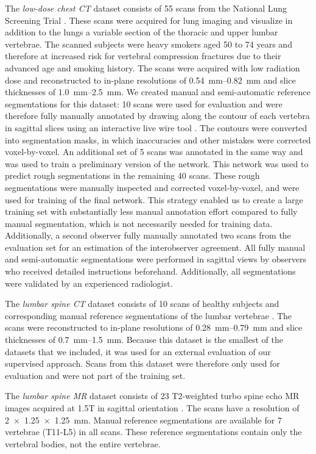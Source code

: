 \documentclass[authoryear,5p,final,times]{elsarticle}
\begin{document}
    The \emph{low-dose chest CT} dataset consists of 55 scans from the National Lung Screening Trial \citep{NLST2011}. These scans were acquired for lung imaging and visualize in addition to the lungs a variable section of the thoracic and upper lumbar vertebrae. The scanned subjects were heavy smokers aged 50 to 74 years and therefore at increased risk for vertebral compression fractures due to their advanced age and smoking history. The scans were acquired with low radiation dose and reconstructed to in-plane resolutions of \SIrange{0.54}{0.82}{\milli\meter} and slice thicknesses of \SIrange{1.0}{2.5}{\milli\meter}. We created manual and semi-automatic reference segmentations for this dataset: 10 scans were used for evaluation and were therefore fully manually annotated by drawing along the contour of each vertebra in sagittal slices using an interactive live wire tool \citep{Barrett1997}. The contours were converted into segmentation masks, in which inaccuracies and other mistakes were corrected voxel-by-voxel. An additional set of 5 scans was annotated in the same way and was used to train a preliminary version of the network. This network was used to predict rough segmentations in the remaining 40 scans. These rough segmentations were manually inspected and corrected voxel-by-voxel, and were used for training of the final network. This strategy enabled us to create a large training set with substantially less manual annotation effort compared to fully manual segmentation, which is not necessarily needed for training data. Additionally, a second observer fully manually annotated two scans from the evaluation set for an estimation of the interobserver agreement. All fully manual and semi-automatic segmentations were performed in sagittal views by observers who received detailed instructions beforehand. Additionally, all segmentations were validated by an experienced radiologist.

    The \emph{lumbar spine CT} dataset consists of 10 scans of healthy subjects and corresponding manual reference segmentations of the lumbar vertebrae \citep{Ibragimov2014,Korez2015}. The scans were reconstructed to in-plane resolutions of \SIrange{0.28}{0.79}{\milli\meter} and slice thicknesses of \SIrange{0.7}{1.5}{\milli\meter}. Because this dataset is the smallest of the datasets that we included, it was used for an external evaluation of our supervised approach. Scans from this dataset were therefore only used for evaluation and were not part of the training set.

    The \emph{lumbar spine MR} dataset consists of 23 T2-weighted turbo spine echo MR images acquired at 1.5T in sagittal orientation \citep{Chu2015}. The scans have a resolution of \SI[allow-number-unit-breaks]{2x1.25x1.25}{\milli\meter}. Manual reference segmentations are available for 7 vertebrae (T11-L5) in all scans. These reference segmentations contain only the vertebral bodies, not the entire vertebrae.
\end{document}
